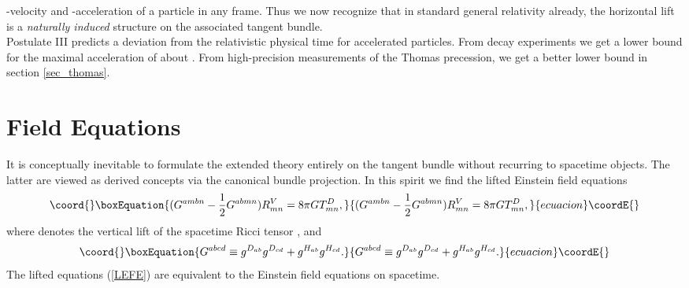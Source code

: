 \documentclass[11pt,a4paper,twoside]{article}
\begin{document}
\coordHE{}-velocity and \coordHE{}-acceleration of a particle in any frame. Thus
we now recognize that in standard general relativity already, the
horizontal lift \coordHE{} is a \textsl{naturally induced} structure on the
associated tangent bundle.\\
Postulate III predicts a deviation from the relativistic physical
time for accelerated particles. From decay experiments \cite{Farley}
we get a lower bound for the maximal acceleration \coordHE{} of
about \coordHE{}. From high-precision measurements of the
Thomas precession, we get a better lower bound in section \ref{sec_thomas}.


\section{Field Equations}
It is conceptually inevitable to formulate the extended theory
entirely on the tangent bundle without recurring to spacetime
objects. The latter are viewed as derived concepts via the canonical
bundle projection. In this spirit we find \cite{bik_paper} the lifted Einstein field
equations
\begin{equation}\coord{}\boxEquation{\label{LEFE}
  (G^{ambn} - \frac{1}{2} G^{abmn}) R^V_{mn} = 8 \pi G T^D_{mn},
}{(G^{ambn} - \frac{1}{2} G^{abmn}) R^V_{mn} = 8 \pi G T^D_{mn},
}{ecuacion}\coordE{}\end{equation}
where \coordHE{} denotes the vertical lift \cite{Yano1973} of the spacetime Ricci tensor
\coordHE{}, and
\begin{equation}\coord{}\boxEquation{
  G^{abcd} \equiv g^{D_{ab}} g^{D_{cd}} + g^{H_{ab}}g^{H_{cd}}.
}{
  G^{abcd} \equiv g^{D_{ab}} g^{D_{cd}} + g^{H_{ab}}g^{H_{cd}}.
}{ecuacion}\coordE{}\end{equation}
The lifted equations (\ref{LEFE}) are equivalent to the Einstein field
equations on spacetime.
\end{document}
